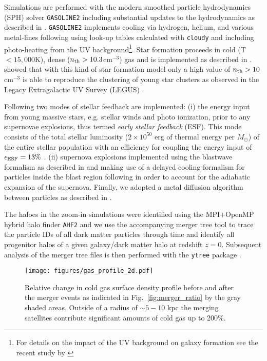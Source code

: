 \documentclass[useAMS,usenatbib]{mnras}
\begin{document}
Simulations are performed with the modern smoothed particle hydrodynamics (SPH) solver {\texttt{GASOLINE2}} \citep{Wadsley2017} including substantial updates to the hydrodynamics as described in \citet{Keller2014}. {\texttt{GASOLINE2}} implements cooling via hydrogen, helium, and various metal-lines following \citet{Shen2010} using look-up tables calculated with \texttt{cloudy} \citep[version 07.02;][]{Ferland1998} and including photo-heating from the \citet{Haardt2005} UV background\footnote{For details on the impact of the UV background on galaxy formation see the recent study by \citet{Obreja2019}}. Star formation proceeds in cold (T $< 15,000$K), dense ($n_{\rm  th}  >  10.3$cm$^{-3}$) gas and is implemented as described in \citet{Stinson2006}. \citet{Buck2019a} showed that with this kind of star formation model only a high value of $n_{\rm  th}>10$cm$^{-3}$ \citep[see also][for an extended parameter study]{Dutton2019,Dutton2020} is able to reproduce the clustering of young star clusters as observed in the Legacy Extragalactic UV Survey (LEGUS) \citep{Calzetti2015,Grasha2017}.

Following \citet{Stinson2013} two modes of stellar feedback are implemented: (i) the energy input from young massive stars, e.g. stellar winds and photo ionization, prior to any supernovae explosions, thus termed \textit{early stellar feedback} (ESF). This mode consists of the total stellar luminosity ($2 \times 10^{50}$ erg of thermal energy per $M_{\odot}$) of the entire stellar population with an efficiency for coupling the energy input of $\epsilon_{\rm ESF}=13\%$ \citep{Wang2015}. (ii) supernova explosions implemented using the blastwave formalism as described in \citet{Stinson2006} and making use of a delayed cooling formalism for particles inside the blast region following \citet{McKee1977} in order to account for the adiabatic expansion of the supernova.
Finally, we adopted a metal diffusion algorithm between particles as described in \citet{Wadsley2008}.

The haloes in the zoom-in simulations were identified using the MPI+OpenMP hybrid halo finder \texttt{AHF2} \citep{Knollmann2009} and we use the accompanying merger tree tool to trace the particle IDs of all dark matter particles through time and identify all progenitor halos of a given galaxy/dark matter halo at redshift $z=0$. Subsequent analysis of the merger tree files is then performed with the {\texttt {ytree}} package \citep{ytree}. 

\begin{figure}
    \begin{centering}
        \texttt{[image: figures/gas\_profile\_2d.pdf]}
        \vspace*{-1.75em}
        \caption{
            Relative change in cold gas surface density profile before and after the merger events as indicated in Fig.~\ref{fig:merger_ratio} by the gray shaded areas. Outside of a radius of $\sim5-10$ kpc the merging satellites contribute significant amounts of cold gas up to 200\%.
        }
        \label{fig:surf_den}
    \end{centering}
\end{figure}
\end{document}
